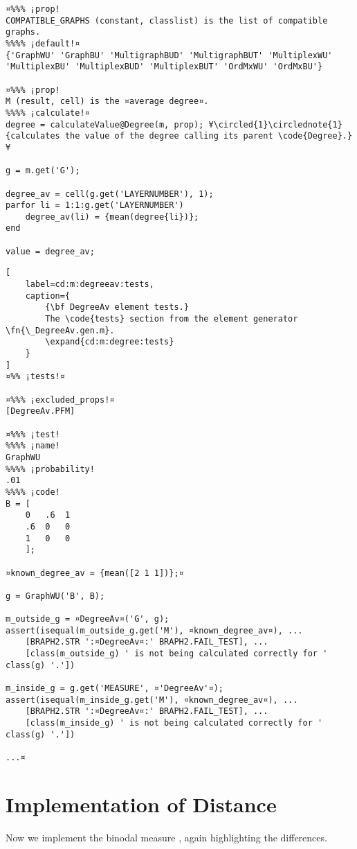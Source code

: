 \documentclass{tufte-handout}
\begin{document}
\begin{lstlisting}
¤%%% ¡prop!
COMPATIBLE_GRAPHS (constant, classlist) is the list of compatible graphs.
%%%% ¡default!¤
{'GraphWU' 'GraphBU' 'MultigraphBUD' 'MultigraphBUT' 'MultiplexWU' 'MultiplexBU' 'MultiplexBUD' 'MultiplexBUT' 'OrdMxWU' 'OrdMxBU'}

¤%%% ¡prop!
M (result, cell) is the ¤average degree¤.
%%%% ¡calculate!¤
degree = calculateValue@Degree(m, prop); ¥\circled{1}\circlednote{1}{calculates the value of the degree calling its parent \code{Degree}.}¥

g = m.get('G');

degree_av = cell(g.get('LAYERNUMBER'), 1);
parfor li = 1:1:g.get('LAYERNUMBER')
    degree_av(li) = {mean(degree{li})};
end

value = degree_av;
\end{lstlisting}

\begin{lstlisting}[
	label=cd:m:degreeav:tests,
	caption={
		{\bf DegreeAv element tests.}
		The \code{tests} section from the element generator \fn{\_DegreeAv.gen.m}.
		\expand{cd:m:degree:tests}
	}
]
¤%% ¡tests!¤

¤%%% ¡excluded_props!¤
[DegreeAv.PFM]

¤%%% ¡test!
%%%% ¡name!
GraphWU
%%%% ¡probability!
.01
%%%% ¡code!
B = [
    0   .6  1
    .6  0   0
    1   0   0
    ];

¤known_degree_av = {mean([2 1 1])};¤

g = GraphWU('B', B);

m_outside_g = ¤DegreeAv¤('G', g);
assert(isequal(m_outside_g.get('M'), ¤known_degree_av¤), ...
    [BRAPH2.STR ':¤DegreeAv¤:' BRAPH2.FAIL_TEST], ...
    [class(m_outside_g) ' is not being calculated correctly for ' class(g) '.'])

m_inside_g = g.get('MEASURE', ¤'DegreeAv'¤);
assert(isequal(m_inside_g.get('M'), ¤known_degree_av¤), ...
    [BRAPH2.STR ':¤DegreeAv¤:' BRAPH2.FAIL_TEST], ...
    [class(m_inside_g) ' is not being calculated correctly for ' class(g) '.'])

...¤
\end{lstlisting}

\clearpage
\section{Implementation of Distance}

Now we implement the binodal measure , again highlighting the differences.
\end{document}
